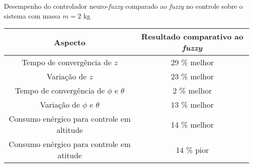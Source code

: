 \begin{quadro}[!htb]
    \centering
    \caption{Desempenho do controlador neuro-\textit{fuzzy} comparado ao \textit{fuzzy} no controle sobre o sistema com massa $m=2$ kg\label{qua:resultados_2kg_comparativo_fuzzy}}
    \begin{tabular}{|c|c|}
        \hline
        \textbf{Aspecto} & 
        \textbf{Resultado comparativo ao \textit{fuzzy}} \\
        \hline %
            Tempo de convergência de $z$ &
            29 \% melhor \\
        \hline %
            Variação de $z$ &
            23 \% melhor \\
        \hline %
            Tempo de convergência de $\phi$ e $\theta$ &
            2 \% melhor \\
        \hline %
            Variação de $\phi$ e $\theta$ &
            13 \% melhor \\
        \hline %
            Consumo enérgico para controle em altitude &
            14 \% melhor \\
        \hline %
            Consumo enérgico para controle em atitude &
            14 \% pior \\
        \hline
    \end{tabular}
\end{quadro}
